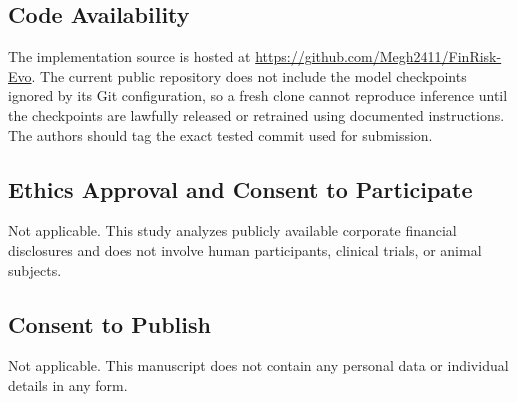 \documentclass[pdflatex,sn-basic,Numbered]{sn-jnl}
\begin{document}
\subsection*{Code Availability}
The implementation source is hosted at \url{https://github.com/Megh2411/FinRisk-Evo}. The current public repository does not include the model checkpoints ignored by its Git configuration, so a fresh clone cannot reproduce inference until the checkpoints are lawfully released or retrained using documented instructions. The authors should tag the exact tested commit used for submission.

\subsection*{Ethics Approval and Consent to Participate}
Not applicable. This study analyzes publicly available corporate financial disclosures and does not involve human participants, clinical trials, or animal subjects.

\subsection*{Consent to Publish}
Not applicable. This manuscript does not contain any personal data or individual details in any form.




\end{document}
